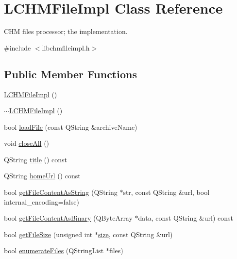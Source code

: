 \hypertarget{classLCHMFileImpl}{\section{L\+C\+H\+M\+File\+Impl Class Reference}
\label{classLCHMFileImpl}
}


C\+H\+M files processor; the implementation.  




{\ttfamily \#include $<$libchmfileimpl.\+h$>$}

\subsection*{Public Member Functions}
\begin{DoxyCompactItemize}
\item 
\hyperlink{classLCHMFileImpl_ab056bfed74452a130cfb26870b3d60d0}{L\+C\+H\+M\+File\+Impl} ()
\item 
\hyperlink{classLCHMFileImpl_a5ac53193d0c20b5ed52bd894987b9760}{$\sim$\+L\+C\+H\+M\+File\+Impl} ()
\item 
bool \hyperlink{classLCHMFileImpl_a2bd2ffb002032653a199f24e091bca24}{load\+File} (const Q\+String \&archive\+Name)
\item 
void \hyperlink{classLCHMFileImpl_a483f7cc028d300635b87e6975c6a1757}{close\+All} ()
\item 
Q\+String \hyperlink{classLCHMFileImpl_ad4d900f2d705ecd494289de810318b5c}{title} () const 
\item 
Q\+String \hyperlink{classLCHMFileImpl_a4a62bf461c3b534161fd2c09b638c929}{home\+Url} () const 
\item 
bool \hyperlink{classLCHMFileImpl_a4e0ea1a6ff803428299be6d72508c5c2}{get\+File\+Content\+As\+String} (Q\+String $\ast$str, const Q\+String \&url, bool internal\+\_\+encoding=false)
\item 
bool \hyperlink{classLCHMFileImpl_a83f47ad1b36f953e7de3d32e3a83313c}{get\+File\+Content\+As\+Binary} (Q\+Byte\+Array $\ast$data, const Q\+String \&url) const 
\item 
bool \hyperlink{classLCHMFileImpl_a956d078842d2cc3ece160c9348930584}{get\+File\+Size} (unsigned int $\ast$\hyperlink{synctex__parser_8c_aa23c661441688350614bd6a350d2b6ff}{size}, const Q\+String \&url)
\item 
bool \hyperlink{classLCHMFileImpl_a21fea24de5c93c2d192fd5c6f26a1dfd}{enumerate\+Files} (Q\+String\+List $\ast$files)
\item 

\end{DoxyCompactItemize}
